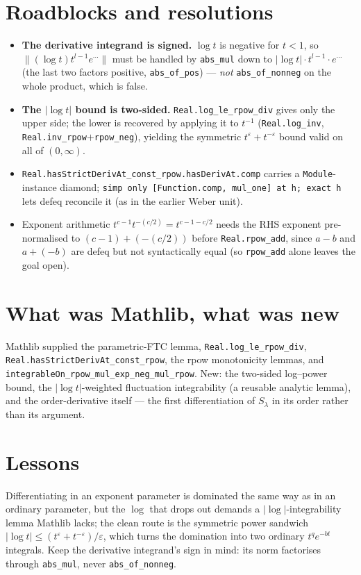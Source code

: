 \documentclass[11pt]{article}
\begin{document}
\section{Roadblocks and resolutions}
\begin{itemize}
\item \textbf{The derivative integrand is signed.} $\log t$ is negative for $t<1$, so
$\|(\log t)t^{l-1}e^{\cdots}\|$ must be handled by \texttt{abs\_mul} down to
$|\log t|\cdot t^{l-1}\cdot e^{\cdots}$ (the last two factors positive, \texttt{abs\_of\_pos}) ---
\emph{not} \texttt{abs\_of\_nonneg} on the whole product, which is false.
\item \textbf{The $|\log t|$ bound is two-sided.} \texttt{Real.log\_le\_rpow\_div} gives only the upper
side; the lower is recovered by applying it to $t^{-1}$ (\texttt{Real.log\_inv},
\texttt{Real.inv\_rpow}$+$\texttt{rpow\_neg}), yielding the symmetric $t^{\varepsilon}+t^{-\varepsilon}$
bound valid on all of $(0,\infty)$.
\item \texttt{Real.hasStrictDerivAt\_const\_rpow.hasDerivAt.comp} carries a \texttt{Module}-instance
diamond; \texttt{simp only [Function.comp, mul\_one] at h; exact h} lets defeq reconcile it (as in the
earlier Weber unit).
\item Exponent arithmetic $t^{c-1}t^{-(c/2)}=t^{c-1-c/2}$ needs the RHS exponent pre-normalised to
$(c-1)+(-(c/2))$ before \texttt{Real.rpow\_add}, since $a-b$ and $a+(-b)$ are defeq but not syntactically
equal (so \texttt{rpow\_add} alone leaves the goal open).
\end{itemize}

\section{What was Mathlib, what was new}
Mathlib supplied the parametric-FTC lemma, \texttt{Real.log\_le\_rpow\_div},
\texttt{Real.hasStrictDerivAt\_const\_rpow}, the rpow monotonicity lemmas, and
\texttt{integrableOn\_rpow\_mul\_exp\_neg\_mul\_rpow}. New: the two-sided log--power bound, the
$|\log t|$-weighted fluctuation integrability (a reusable analytic lemma), and the order-derivative
itself --- the first differentiation of $S_\lambda$ in its order rather than its argument.

\section{Lessons}
Differentiating in an exponent parameter is dominated the same way as in an ordinary parameter, but the
$\log$ that drops out demands a $|\log|$-integrability lemma Mathlib lacks; the clean route is the
symmetric power sandwich $|\log t|\le(t^\varepsilon+t^{-\varepsilon})/\varepsilon$, which turns the
domination into two ordinary $t^q e^{-bt}$ integrals. Keep the derivative integrand's sign in mind: its
norm factorises through \texttt{abs\_mul}, never \texttt{abs\_of\_nonneg}.
\end{document}
